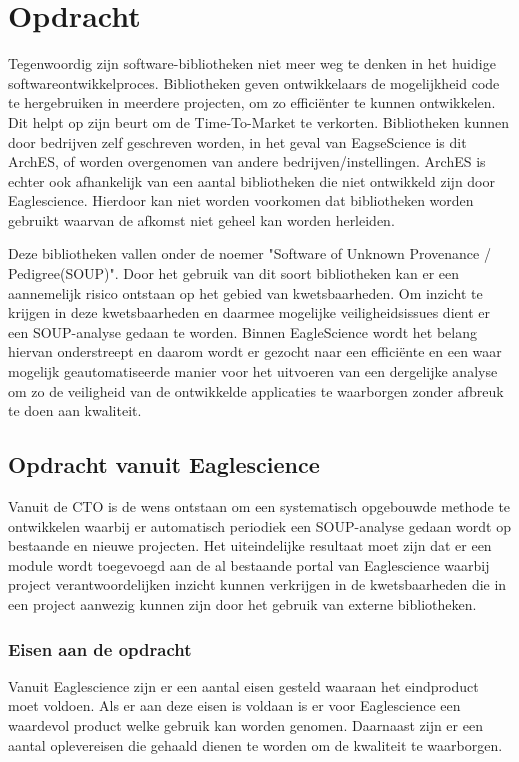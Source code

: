 
\chapter{Opdracht}\label{ch:opdracht} %


Tegenwoordig zijn software-bibliotheken niet meer weg te denken in het huidige software\-ontwikkelproces. Bibliotheken geven ontwikkelaars de mogelijkheid code te hergebruiken in meerdere projecten, om zo efficiënter te kunnen ontwikkelen. Dit helpt op zijn beurt om de Time-To-Market te verkorten. Bibliotheken kunnen door bedrijven zelf geschreven worden, in het geval van EagseScience is dit ArchES, of worden overgenomen van andere bedrijven/instellingen. ArchES is echter ook afhankelijk van een aantal bibliotheken die niet ontwikkeld zijn door Eaglescience. Hierdoor kan niet worden voorkomen dat bibliotheken worden gebruikt waarvan de afkomst niet geheel kan worden herleiden.

Deze bibliotheken vallen onder de noemer "Software of Unknown Provenance / Pedigree(SOUP)". Door het gebruik van dit soort bibliotheken kan er een aannemelijk risico ontstaan op het gebied van kwetsbaarheden. Om inzicht te krijgen in deze kwetsbaarheden en daarmee mogelijke veiligheidsissues dient er een SOUP-analyse gedaan te worden. Binnen EagleScience wordt het belang hiervan onderstreept en daarom wordt er gezocht naar een efficiënte en een waar mogelijk geautomatiseerde manier voor het uitvoeren van een dergelijke analyse om zo de veiligheid van de ontwikkelde applicaties te waarborgen zonder afbreuk te doen aan kwaliteit.

\section{Opdracht vanuit Eaglescience}\label{sec:opdracht-vanuit-eaglescience}
Vanuit de CTO is de wens ontstaan om een systematisch opgebouwde methode te ontwikkelen waarbij er automatisch periodiek een SOUP-analyse gedaan wordt op bestaande en nieuwe projecten. Het uiteindelijke resultaat moet zijn dat er een module wordt toegevoegd aan de al bestaande portal van Eaglescience waarbij project verantwoordelijken inzicht kunnen verkrijgen in de kwetsbaarheden die in een project aanwezig kunnen zijn door het gebruik van externe bibliotheken.

\subsection{Eisen aan de opdracht}\label{subsec: eisen-aan-de-opdracht}
Vanuit Eaglescience zijn er een aantal eisen gesteld waaraan het eindproduct moet voldoen. Als er aan deze eisen is voldaan is er voor Eaglescience een waardevol product welke gebruik kan worden genomen. Daarnaast zijn er een aantal oplevereisen die gehaald dienen te worden om de kwaliteit te waarborgen.

